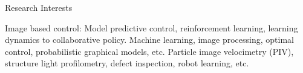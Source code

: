 \begin{rubric}{Research Interests}


\entry*[]%
Image based control: Model predictive control, reinforcement learning, learning dynamics to collaborative policy.
%
\entry*[]%
	Machine learning, image processing, optimal control, probabilistic graphical models, etc.
%
\entry*[]%
	Particle image velocimetry (PIV), structure light profilometry, defect inspection, robot learning, etc.

\end{rubric}